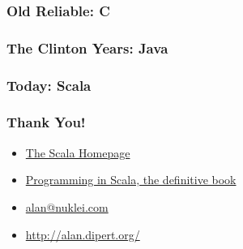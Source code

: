 \documentclass[hyperref={colorlinks=true}]{beamer}
\begin{document}
\begin{frame} 
\frametitle{Old Reliable: C}
\tt\tiny{

}
\end{frame} 

\begin{frame} 
\frametitle{The Clinton Years: Java}
\tt\tiny{

}
\end{frame} 

\begin{frame} 
\frametitle{Today: Scala}
\tt\tiny{

}
\end{frame} 

\begin{frame} 
\frametitle{Thank You!}
\begin{itemize}
  \item<1-> \href{http://www.scala-lang.org/}{The Scala Homepage}
  \item<1-> \href{http://www.artima.com/shop/programming_in_scala}{Programming in Scala, the definitive book}
\end{itemize}
\begin{itemize}
  \item<1-> \href{mailto:alan@nuklei.com}{alan@nuklei.com}
  \item<1-> \href{http://alan.dipert.org/}{http://alan.dipert.org/}
\end{itemize}
\end{frame} 
\end{document}
